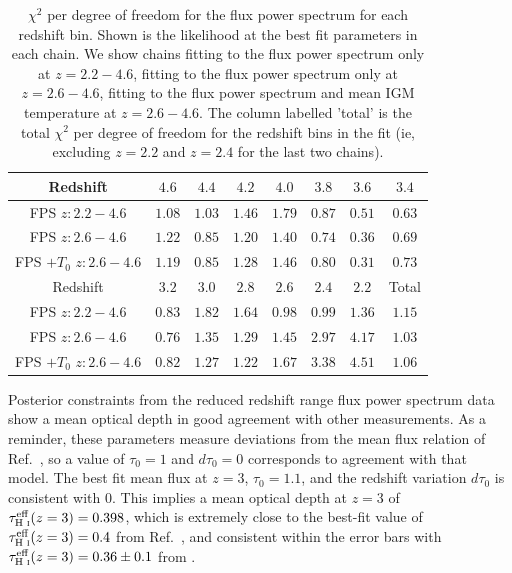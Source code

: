 \begin{table}
	\centering
     \def\arraystretch{1.2}
     \begin{tabular}{|c|c|c|c|c|c|c|c|}
		\hline
		Redshift & $4.6$ & $4.4$ & $4.2$ & $4.0$ & $3.8$ & $3.6$ & $3.4$\\
		\hline
        FPS $z: 2.2-4.6$ & $1.08$ & $1.03$ & $1.46$ & $1.79$ & $0.87$ & $0.51$ & $0.63$ \\
        FPS $z: 2.6-4.6$ & $1.22$ & $0.85$ & $1.20$ & $1.40$ & $0.74$ & $0.36$ & $0.69$\\
        FPS $+ T_0$ $z: 2.6-4.6$ & $1.19$ & $0.85$ & $1.28$ & $1.46$ & $0.80$ & $0.31$ & $0.73$ \\
        \hline
        Redshift & $3.2$ & $3.0$ & $2.8$ & $2.6$ & $2.4$ & $2.2$ & Total \\
		\hline
        FPS $z: 2.2-4.6$ & $0.83$ & $1.82$ & $1.64$ & $0.98$ & $0.99$ & $1.36$ & $1.15$ \\
        FPS $z: 2.6-4.6$ & $0.76$ & $1.35$ & $1.29$ & $1.45$ & $2.97$ & $4.17$ & $1.03$ \\
        FPS $+ T_0$ $z: 2.6-4.6$ & $0.82$ & $1.27$ & $1.22$ & $1.67$ & $3.38$ & $4.51$ & $1.06$\\
  \hline
	\end{tabular}
    \caption{\label{table:chi2}
    $\chi^2$ per degree of freedom for the flux power spectrum for each redshift bin.
    Shown is the likelihood at the best fit parameters in each chain. We show chains fitting to the flux power spectrum only at $z=2.2 - 4.6$, fitting to the flux power spectrum only at $z=2.6 - 4.6$, fitting to the flux power spectrum and mean IGM temperature at $z=2.6 - 4.6$. The column labelled 'total' is the total $\chi^2$ per degree of freedom for the redshift bins in the fit (ie, excluding $z=2.2$ and $z=2.4$ for the last two chains). }
\end{table}

Posterior constraints from the reduced redshift range flux power spectrum data show a mean optical depth in good agreement with other measurements. As a reminder, these parameters measure deviations from the mean flux relation of Ref.~\cite{2007MNRAS.382.1657K}, so a value of $\tau_0=1$ and $d\tau_0=0$ corresponds to agreement with that model. The best fit mean flux at $z=3$, $\tau_0 = 1.1$, and the redshift variation $d\tau_0$ is consistent with $0$. This implies a mean optical depth at $z=3$ of $\tau^{\text{eff}}_{\text{H~{\sc i}}}(z=3) = 0.398$, which is extremely close to the best-fit value of $\tau^{\text{eff}}_{\text{H~{\sc i}}}(z=3) = 0.4$ from Ref.~\cite{2013MNRAS.430.2067B}, and consistent within the error bars with $\tau^{\text{eff}}_{\text{H~{\sc i}}}(z=3) = 0.36 \pm 0.1$ from \cite{2007MNRAS.382.1657K}. 

